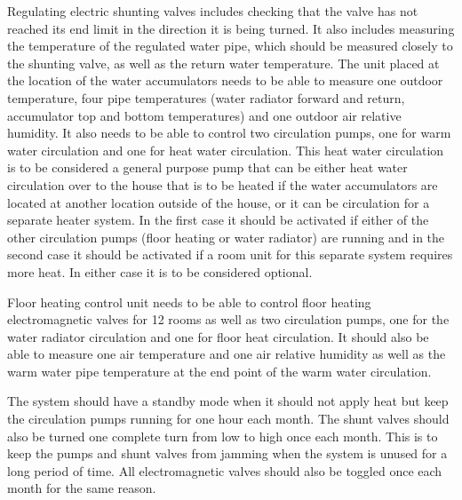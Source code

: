 Regulating electric shunting valves includes checking that the valve
has not reached its end limit in the direction it is being turned. It
also includes measuring the temperature of the regulated water pipe,
which should be measured closely to the shunting valve, as well as the
return water temperature. The unit placed at the location of the water
accumulators needs to be able to measure one outdoor temperature, four
pipe temperatures (water radiator forward and return, accumulator top
and bottom temperatures) and one outdoor air relative humidity. It
also needs to be able to control two circulation pumps, one for warm
water circulation and one for heat water circulation. This heat water
circulation is to be considered a general purpose pump that can be
either heat water circulation over to the house that is to be heated
if the water accumulators are located at another location outside of
the house, or it can be circulation for a separate heater system. In
the first case it should be activated if either of the other
circulation pumps (floor heating or water radiator) are running and in
the second case it should be activated if a room unit for this
separate system requires more heat. In either case it is to be
considered optional.

Floor heating control unit needs to be able to control floor heating
electromagnetic valves for 12 rooms as well as two circulation pumps,
one for the water radiator circulation and one for floor heat
circulation. It should also be able to measure one air temperature and
one air relative humidity as well as the warm water pipe temperature
at the end point of the warm water circulation.

The system should have a standby mode when it should not apply heat
but keep the circulation pumps running for one hour each month. The
shunt valves should also be turned one complete turn from low to high
once each month. This is to keep the pumps and shunt valves from
jamming when the system is unused for a long period of time. All
electromagnetic valves should also be toggled once each month for the
same reason.


